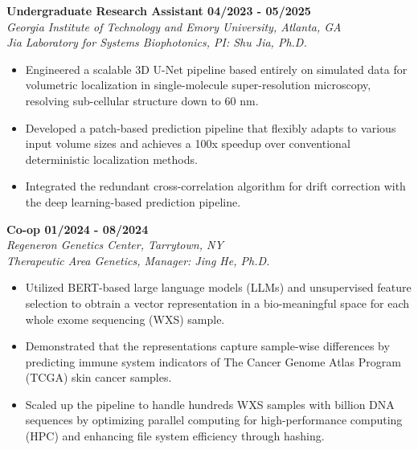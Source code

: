 \documentclass[letterpaper, 11pt]{article}
\newcommand{\subsectionvspace}{\vspace{8pt}}
\begin{document}
    \textbf{Undergraduate Research Assistant \hfill 04/2023 - 05/2025} \\
    \textit{Georgia Institute of Technology and Emory University, Atlanta, GA} \\
    \textit{Jia Laboratory for Systems Biophotonics, PI: Shu Jia, Ph.D.}
    \begin{itemize}
        \item Engineered a scalable 3D U-Net pipeline based entirely on simulated data for volumetric localization in single-molecule super-resolution microscopy, resolving sub-cellular structure down to 60 nm.
        \item Developed a patch-based prediction pipeline that flexibly adapts to various input volume sizes and achieves a 100x speedup over conventional deterministic localization methods.
        \item Integrated the redundant cross-correlation algorithm for drift correction with the deep learning-based prediction pipeline.
    \end{itemize}

    \subsectionvspace

    \textbf{Co-op \hfill 01/2024 - 08/2024} \\
    \textit{Regeneron Genetics Center, Tarrytown, NY} \\
    \textit{Therapeutic Area Genetics, Manager: Jing He, Ph.D.}
    \begin{itemize}
        \item Utilized BERT-based large language models (LLMs) and unsupervised feature selection to obtrain a vector representation in a bio-meaningful space for each whole exome sequencing (WXS) sample.
        \item Demonstrated that the representations capture sample-wise differences by predicting immune system indicators of The Cancer Genome Atlas Program (TCGA) skin cancer samples.
        \item Scaled up the pipeline to handle hundreds WXS samples with billion DNA sequences by optimizing parallel computing for high-performance computing (HPC) and enhancing file system efficiency through hashing.
    \end{itemize}

    \subsectionvspace
\end{document}
